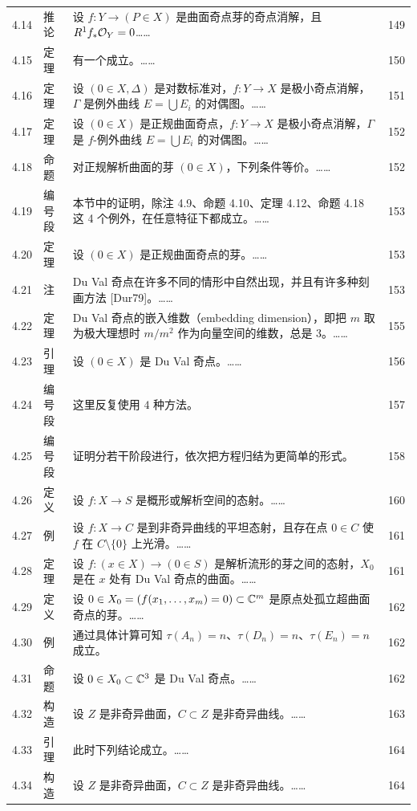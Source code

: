\begin{longtable}{@{}p{}p{}p{}p{}@{}}
4.14 & 推论 & 设 $f\colon Y\to(P\in X)$ 是曲面奇点芽的奇点消解，且 $R^1f_*\mathcal{O}_Y=0$…… & 149 \\
4.15 & 定理 & 有一个成立。…… & 150 \\
4.16 & 定理 & 设 $(0\in X,\Delta)$ 是对数标准对，$f\colon Y\to X$ 是极小奇点消解，$\Gamma$ 是例外曲线 $E=\bigcup E_i$ 的对偶图。…… & 151 \\
4.17 & 定理 & 设 $(0\in X)$ 是正规曲面奇点，$f\colon Y\to X$ 是极小奇点消解，$\Gamma$ 是 $f$-例外曲线 $E=\bigcup E_i$ 的对偶图。…… & 152 \\
4.18 & 命题 & 对正规解析曲面的芽 $(0\in X)$，下列条件等价。…… & 152 \\
4.19 & 编号段 & 本节中的证明，除注 4.9、命题 4.10、定理 4.12、命题 4.18 这 4 个例外，在任意特征下都成立。…… & 153 \\
4.20 & 定理 & 设 $(0\in X)$ 是正规曲面奇点的芽。…… & 153 \\
4.21 & 注 & Du Val 奇点在许多不同的情形中自然出现，并且有许多种刻画方法 [Dur79]。…… & 153 \\
4.22 & 定理 & Du Val 奇点的嵌入维数（embedding dimension），即把 $m$ 取为极大理想时 $m/m^2$ 作为向量空间的维数，总是 $3$。…… & 155 \\
4.23 & 引理 & 设 $(0\in X)$ 是 Du Val 奇点。…… & 156 \\
4.24 & 编号段 & 这里反复使用 $4$ 种方法。 & 157 \\
4.25 & 编号段 & 证明分若干阶段进行，依次把方程归结为更简单的形式。 & 158 \\
4.26 & 定义 & 设 $f\colon X\to S$ 是概形或解析空间的态射。…… & 160 \\
4.27 & 例 & 设 $f\colon X\to C$ 是到非奇异曲线的平坦态射，且存在点 $0\in C$ 使 $f$ 在 $C\setminus\{0\}$ 上光滑。…… & 161 \\
4.28 & 定理 & 设 $f\colon (x\in X)\to(0\in S)$ 是解析流形的芽之间的态射，$X_0$ 是在 $x$ 处有 Du Val 奇点的曲面。…… & 161 \\
4.29 & 定义 & 设 $0\in X_0=(f(x_1,\dots,x_m)=0)\subset\mathbb{C}^m$ 是原点处孤立超曲面奇点的芽。…… & 162 \\
4.30 & 例 & 通过具体计算可知 $\tau(A_n)=n$、$\tau(D_n)=n$、$\tau(E_n)=n$ 成立。 & 162 \\
4.31 & 命题 & 设 $0\in X_0\subset\mathbb{C}^3$ 是 Du Val 奇点。…… & 162 \\
4.32 & 构造 & 设 $Z$ 是非奇异曲面，$C\subset Z$ 是非奇异曲线。…… & 163 \\
4.33 & 引理 & 此时下列结论成立。…… & 164 \\
4.34 & 构造 & 设 $Z$ 是非奇异曲面，$C\subset Z$ 是非奇异曲线。…… & 164 \\

\end{longtable}
